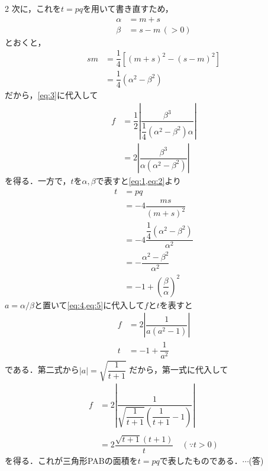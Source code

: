 \documentclass[../../main.tex]{subfiles}
\begin{document}
\begin{multicols}{2}
  次に，これを$t=pq$を用いて書き直すため，
  \begin{align}
    \alpha & =m+s        \\
    \beta  & =s-m\, (>0)
  \end{align}
  とおくと，
  \begin{align}
    sm
    & =\dfrac{1}{4}\left[(m+s)^2-(s-m)^2\right] \\
    & =\dfrac{1}{4}(\alpha^2-\beta^2)
  \end{align}
  だから，\cref{eq:3}に代入して
  \begin{align}
    f
    & =\dfrac{1}{2}\left|\dfrac{\beta^3}{\dfrac{1}{4}(\alpha^2-\beta^2)\alpha}\right| \nonumber \\
    & =2\left|\dfrac{\beta^3}{\alpha(\alpha^2-\beta^2)}\right| \label{eq:4}
  \end{align}
  を得る．一方で，$t$を$\alpha,\beta$で表すと\cref{eq:1,eq:2}より
  \begin{align}
    t
    & = pq                                     \nonumber            \\
    & = -4\dfrac{ms}{(m+s)^2}                             \nonumber  \\
    & = -4\dfrac{\dfrac{1}{4}(\alpha^2-\beta^2)}{\alpha^2}  \nonumber \\
    & =-\dfrac{\alpha^2-\beta^2}{\alpha^2}                 \nonumber \\
    & =-1+\left(\dfrac{\beta}{\alpha}\right)^2 \label{eq:5}
  \end{align}
  $a = \alpha/\beta$と置いて\cref{eq:4,eq:5}に代入して$f$と$t$を表すと
  \begin{align}
    f & =2\left|\dfrac{1}{a(a^2-1)}\right| \\
    t & =-1+\dfrac{1}{a^2}
  \end{align}
  である．第二式から$|a|=\sqrt{\dfrac{1}{t+1}}$ だから，第一式に代入して
  \begin{align}
    f
    & =2\left|\dfrac{1}{\sqrt{\dfrac{1}{t+1}}\left(\dfrac{1}{t+1}-1\right)}\right| \nonumber \\                                    \\
    & =2\dfrac{\sqrt{t+1}(t+1)}{t} \quad (\because t>0) \label{eq:6}
  \end{align}
  を得る．これが三角形PABの面積を$t=pq$で表したものである．$\cdots$(答)


\end{multicols}
\end{document}
